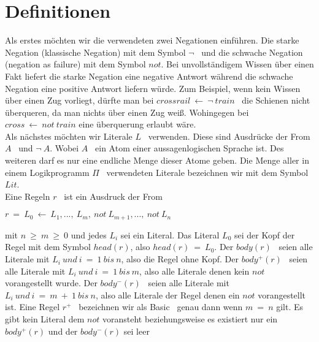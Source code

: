 \section{Definitionen}

Als erstes möchten wir die verwendeten zwei Negationen einführen.
Die starke Negation (klassische Negation) mit dem Symbol \glqq $\neg$\grqq~ und die
schwache Negation (negation as failure) mit dem Symbol \glqq $not$\grqq.
Bei unvollständigem Wissen über einen Fakt liefert die starke Negation
eine negative Antwort während die schwache Negation eine positive Antwort liefern würde.
Zum Beispiel, wenn kein Wissen über einen Zug vorliegt, dürfte man
bei \glqq $cross rail~\leftarrow~\neg~train$\grqq~ die Schienen nicht überqueren,
da man nichts über einen Zug weiß. Wohingegen bei $cross~\leftarrow~not~train$
eine überquerung erlaubt wäre.\\

Als nächstes möchten wir Literale \glqq $L$\grqq~ verwenden.
Diese sind Ausdrücke der From \glqq $A$\grqq~ und \glqq $\neg~A$\grqq.
Wobei \glqq $A$\grqq~ ein Atom einer aussagenlogischen Sprache ist.
Des weiteren darf es nur eine endliche Menge dieser Atome geben.
Die Menge aller in einem Logikprogramm \glqq $\Pi$\grqq~ verwendeten Literale
bezeichnen wir mit dem Symbol \glqq $Lit$\grqq.\\

Eine Regeln \glqq $r$\grqq~ ist ein Ausdruck der From

\begin{center}
	$r~=~L_0~\leftarrow~L_1,...,~L_m,~not~L_{m+1},...,~not~L_n$\\
\end{center}

mit $n~\geq~m~\geq~0$ und jedes $L_i$ sei ein Literal.
Das Literal $L_0$ sei der Kopf der Regel mit dem Symbol \glqq $head(r)$\grqq,
also $head(r)~=~L_0$. Der \glqq $body(r)$\grqq~ seien alle Literale mit
$L_i~und~i~=~1~bis~n$, also die Regel ohne Kopf. Der \glqq $body^+(r)$\grqq~
seien alle Literale mit $L_i~und~i~=~1~bis~m$, also alle Literale denen kein $not$
vorangestellt wurde. Der \glqq $body^-(r)$\grqq~ seien alle Literale mit
$L_i~und~i~=~m~+~1~bis~n$\grqq, also alle Literale der Regel denen
ein $not$ vorangestellt ist.
Eine Regel \glqq $r^+$\grqq~ bezeichnen wir als \glqq Basic\grqq~ genau dann wenn
$m~=~n$ gilt. Es gibt kein Literal dem $not$ voransteht beziehungsweise es
existiert nur ein $body^+(r)$ und der $body^-(r)$ sei leer 

